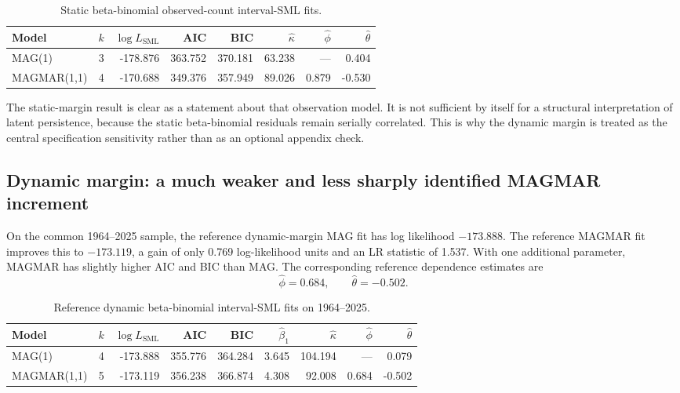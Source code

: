 \documentclass[11pt]{article}
\theoremstyle{definition}
\begin{document}
\begin{table}[t]
\centering
\caption{Static beta-binomial observed-count interval-SML fits.}
\label{tab:static-primary}
\begin{tabular}{lrrrrrrr}
\toprule
Model & $k$ & $\log L_{\mathrm{SML}}$ & AIC & BIC & $\widehat\kappa$ & $\widehat\phi$ & $\widehat\theta$ \\
\midrule
MAG(1)      & 3 & -178.876 & 363.752 & 370.181 & 63.238 & ---   & 0.404 \\
MAGMAR(1,1) & 4 & -170.688 & 349.376 & 357.949 & 89.026 & 0.879 & -0.530 \\
\bottomrule
\end{tabular}
\end{table}

The static-margin result is clear as a statement about that observation model. It is
not sufficient by itself for a structural interpretation of latent persistence,
because the static beta-binomial residuals remain serially correlated. This is why
the dynamic margin is treated as the central specification sensitivity rather than
as an optional appendix check.

\subsection{Dynamic margin: a much weaker and less sharply identified MAGMAR increment}
\label{subsec:dynamic-results}

On the common 1964--2025 sample, the reference dynamic-margin MAG fit has log
likelihood $-173.888$. The reference MAGMAR fit improves this to $-173.119$, a gain
of only 0.769 log-likelihood units and an LR statistic of 1.537. With one additional
parameter, MAGMAR has slightly higher AIC and BIC than MAG. The corresponding
reference dependence estimates are
\[
\widehat\phi=0.684,
\qquad
\widehat\theta=-0.502.
\]

\begin{table}[t]
\centering
\caption{Reference dynamic beta-binomial interval-SML fits on 1964--2025.}
\label{tab:dynamic-primary}
\small
\begin{tabular}{lrrrrrrrr}
\toprule
Model & $k$ & $\log L_{\mathrm{SML}}$ & AIC & BIC & $\widehat\beta_1$ & $\widehat\kappa$ & $\widehat\phi$ & $\widehat\theta$ \\
\midrule
MAG(1)      & 4 & -173.888 & 355.776 & 364.284 & 3.645 & 104.194 & ---   & 0.079 \\
MAGMAR(1,1) & 5 & -173.119 & 356.238 & 366.874 & 4.308 & 92.008  & 0.684 & -0.502 \\
\bottomrule
\end{tabular}
\end{table}
\end{document}

